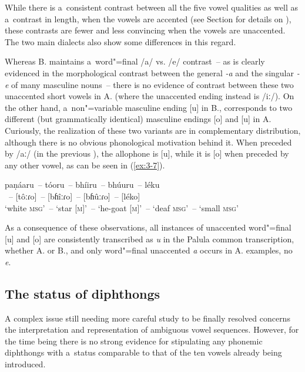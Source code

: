 While there is a~consistent contrast between all the five vowel qualities as well as a~contrast in length, when the vowels are accented (see Section  for details on ), these contrasts are fewer and less convincing when the vowels are unaccented. The two main dialects also show some differences in this regard. 


Whereas B. maintains a~word"=final /a/ vs. /e/ contrast~-- as is clearly evidenced in the morphological contrast between the general   \textit{-a} and the  singular \textit{-e} of many masculine nouns~-- there is no evidence of contrast between these two unaccented short vowels in A. (where the unaccented  ending instead is /iː/). On the other hand, a~non"=variable masculine ending [u] in B., corresponds to two different (but grammatically identical) masculine endings [o] and [u] in A. Curiously, the realization of these two variants are in complementary distribution, although there is no obvious phonological motivation behind it. When preceded by /aː/ (in the previous ), the allophone is [u], while it is [o] when preceded by any other vowel, as can be seen in (\ref{ex:3-7}).

\begin{exe}
\ex
\label{ex:3-7}
\gll paṇáaru~-- tóoru~-- bhíiru~-- bhúuru~--  léku \\
[paɳâːɾu]~-- [tôːɾo]~-- [bɦîːɾo]~-- [bɦûːɾo]~-- [léko] \\ 
\glt `white \textsc{msg}'~-- `star [\textsc{m}]'~-- `he-goat [\textsc{m}]'~-- `deaf \textsc{msg}'~-- `small \textsc{msg}'
\end{exe}

As a consequence of these observations, all instances of unaccented word"=final [u] and [o] are consistently transcribed as \textit{u} in the Palula common transcription, whether A. or B., and only word"=final unaccented \textit{a} occurs in A. examples, no \textit{e}.


\subsection{The status of diphthongs}
\label{subsec:3-2-3}

A complex issue still needing more careful study to be finally resolved concerns the interpretation and representation of ambiguous vowel sequences. However, for the time being there is no strong evidence for stipulating any phonemic diphthongs with a~status comparable to that of the ten vowels already being introduced.


